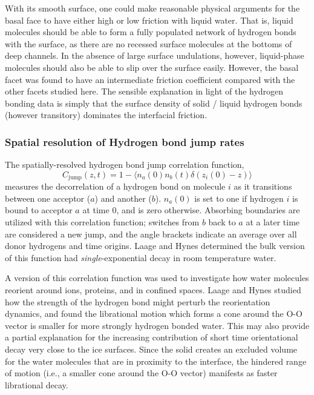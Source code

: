 With its smooth surface, one could make reasonable physical arguments
for the basal face to have either high or low friction with liquid
water. That is, liquid molecules should be able to form a fully
populated network of hydrogen bonds with the surface, as there are no
recessed surface molecules at the bottoms of deep channels. In the
absence of large surface undulations, however, liquid-phase molecules
should also be able to slip over the surface easily. However, the
basal facet was found to have an intermediate friction coefficient
compared with the other facets studied here. The sensible explanation
in light of the hydrogen bonding data is simply that the surface
density of solid / liquid hydrogen bonds (however transitory)
dominates the interfacial friction.

\subsubsection{Spatial resolution of Hydrogen bond jump rates}
The spatially-resolved hydrogen bond jump correlation function,
\begin{equation}\label{jump}
C_\mathrm{jump}(z,t) = 1 - \langle n_a(0) n_b(t) \delta(z_i(0) - z) \rangle
\end{equation}
measures the decorrelation of a hydrogen bond on molecule $i$ as it
transitions between one acceptor ($a$) and another ($b$). $n_a(0)$ is
set to one if hydrogen $i$ is bound to acceptor $a$ at time $0$, and
is zero otherwise.  Absorbing boundaries are utilized with this
correlation function; switches from $b$ back to $a$ at a later time
are considered a new jump, and the angle brackets indicate an average
over all donor hydrogens and time origins. Laage and Hynes determined
the bulk version of this function had \textit{single}-exponential
decay in room temperature water.

A version of this correlation function was used to investigate how
water molecules reorient around
ions\cite{Laage2007,Laage2008a,Stirnemann2011a,Laage2011},
proteins\cite{Duboue-Dijon2014}, and in confined
spaces\cite{Laage2012b,Fogarty2014}.  Laage and Hynes studied how the
strength of the hydrogen bond might perturb the reorientation
dynamics,\cite{Laage2006a} and found the librational motion which
forms a cone around the O-O vector is smaller for more strongly
hydrogen bonded water. This may also provide a partial explanation for
the increasing contribution of short time orientational decay very
close to the ice surfaces.  Since the solid creates an excluded volume
for the water molecules that are in proximity to the interface, the
hindered range of motion (i.e., a smaller cone around the O-O vector)
manifests as faster librational decay.

